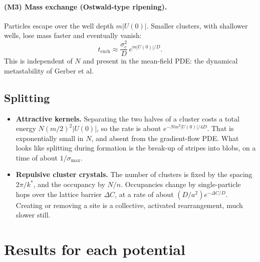 \documentclass[11pt]{article}
\begin{document}
\paragraph{(M3) Mass exchange (Ostwald-type ripening).} Particles escape over
the well depth $m|U(0)|$. Smaller clusters, with shallower wells, lose mass
faster and eventually vanish:
\begin{equation}
  t_{\mathrm{exch}} \approx \frac{\sigma_c^2}{D}\,e^{m|U(0)|/D} .
\end{equation}
This is independent of $N$ and present in the mean-field PDE: the dynamical
metastability of Gerber et al.

\subsection{Splitting}
\begin{itemize}
  \item \textbf{Attractive kernels.} Separating the two halves of a cluster
        costs a total energy $N(m/2)^2|U(0)|$, so the rate is about
        $e^{-Nm^2|U(0)|/4D}$. That is exponentially small in $N$, and absent
        from the gradient-flow PDE. What looks like splitting during
        formation is the break-up of stripes into blobs, on a time of about
        $1/\sigma_{\max}$.
  \item \textbf{Repulsive cluster crystals.} The number of clusters is fixed
        by the spacing $2\pi/k^*$, and the occupancy by $N/n$. Occupancies
        change by single-particle hops over the lattice barrier $\Delta C$, at
        a rate of about $(D/a^2)e^{-\Delta C/D}$. Creating or removing a site
        is a collective, activated rearrangement, much slower still.
\end{itemize}

\section{Results for each potential}
\end{document}
